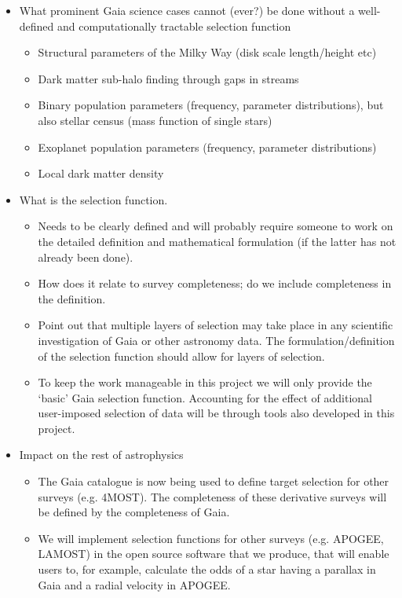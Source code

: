 \begin{itemize}
    \item What prominent Gaia science cases cannot (ever?) be done without a well-defined and computationally tractable
        selection function
        \begin{itemize}
            \item Structural parameters of the Milky Way (disk scale length/height etc)
            \item Dark matter sub-halo finding through gaps in streams
            \item Binary population parameters (frequency, parameter distributions), but also stellar census (mass function of single stars)
            \item Exoplanet population parameters (frequency, parameter distributions)
            \item Local dark matter density
        \end{itemize}
    \item What is the selection function.
        \begin{itemize}
            \item Needs to be clearly defined and will probably require someone to work on the detailed definition and
                mathematical formulation (if the latter has not already been done).
            \item How does it relate to survey completeness; do we include completeness in the definition.
            \item Point out that multiple layers of selection may take place in any scientific investigation of Gaia or
                other astronomy data. The formulation/definition of the selection function should allow for layers of
                selection.
            \item To keep the work manageable in this project we will only provide the `basic' Gaia selection function.
                Accounting for the effect of additional user-imposed selection of data will be through tools also
                developed in this project.
        \end{itemize}
    \item Impact on the rest of astrophysics
        \begin{itemize}
            \item The Gaia catalogue is now being used to define target selection for other surveys (e.g. 4MOST). The completeness of these derivative surveys will be defined by the completeness of Gaia.
            \item We will implement selection functions for other surveys (e.g. APOGEE, LAMOST) in the open source software that we produce, that will enable users to, for example, calculate the odds of a star having a parallax in Gaia and a radial velocity in APOGEE.
        \end{itemize}
\end{itemize}

